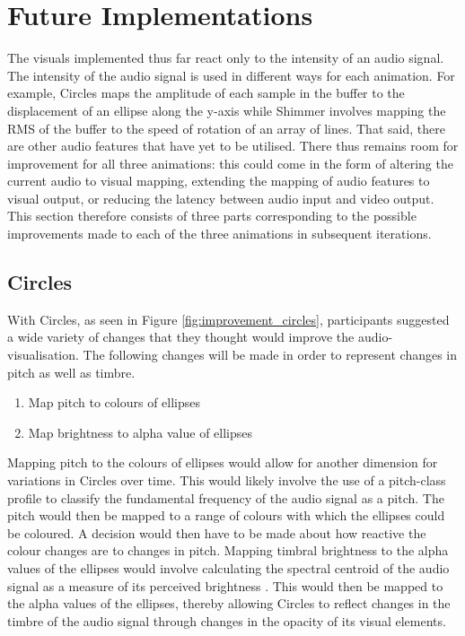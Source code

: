 \documentclass[../initial_thesis.tex]{subfiles}
\begin{document}
\section{Future Implementations}
The visuals implemented thus far react only to the intensity of an audio signal. The intensity of the audio signal is used in different ways for each animation. For example, Circles maps the amplitude of each sample in the buffer to the displacement of an ellipse along the y-axis while Shimmer involves mapping the RMS of the buffer to the speed of rotation of an array of lines. That said, there are other audio features that have yet to be utilised. There thus remains room for improvement for all three animations: this could come in the form of altering the current audio to visual mapping, extending the mapping of audio features to visual output, or reducing the latency between audio input and video output. This section therefore consists of three parts corresponding to the possible improvements made to each of the three animations in subsequent iterations.

\subsection{Circles}
With Circles, as seen in Figure \ref{fig:improvement_circles}, participants suggested a wide variety of changes that they thought would improve the audio-visualisation. The following changes will be made in order to represent changes in pitch as well as timbre.

\begin{enumerate}
\item {Map pitch to colours of ellipses}
\item {Map brightness to alpha value of ellipses}
\end{enumerate}

Mapping pitch to the colours of ellipses would allow for another dimension for variations in Circles over time. This would likely involve the use of a pitch-class profile to classify the fundamental frequency of the audio signal as a pitch. The pitch would then be mapped to a range of colours with which the ellipses could be coloured. A decision would then have to be made about how reactive the colour changes are to changes in pitch. Mapping timbral brightness to the alpha values of the ellipses would involve calculating the spectral centroid of the audio signal as a measure of its perceived brightness \cite{Schubert}. This would then be mapped to the alpha values of the ellipses, thereby allowing Circles to reflect changes in the timbre of the audio signal through changes in the opacity of its visual elements.
\end{document}
